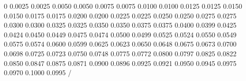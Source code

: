          0
    0.0025    0.0025
    0.0050    0.0050
    0.0075    0.0075
    0.0100    0.0100
    0.0125    0.0125
    0.0150    0.0150
    0.0175    0.0175
    0.0200    0.0200
    0.0225    0.0225
    0.0250    0.0250
    0.0275    0.0275
    0.0300    0.0300
    0.0325    0.0325
    0.0350    0.0350
    0.0375    0.0375
    0.0400    0.0399
    0.0425    0.0424
    0.0450    0.0449
    0.0475    0.0474
    0.0500    0.0499
    0.0525    0.0524
    0.0550    0.0549
    0.0575    0.0574
    0.0600    0.0599
    0.0625    0.0623
    0.0650    0.0648
    0.0675    0.0673
    0.0700    0.0698
    0.0725    0.0723
    0.0750    0.0748
    0.0775    0.0772
    0.0800    0.0797
    0.0825    0.0822
    0.0850    0.0847
    0.0875    0.0871
    0.0900    0.0896
    0.0925    0.0921
    0.0950    0.0945
    0.0975    0.0970
    0.1000    0.0995
/\relax
